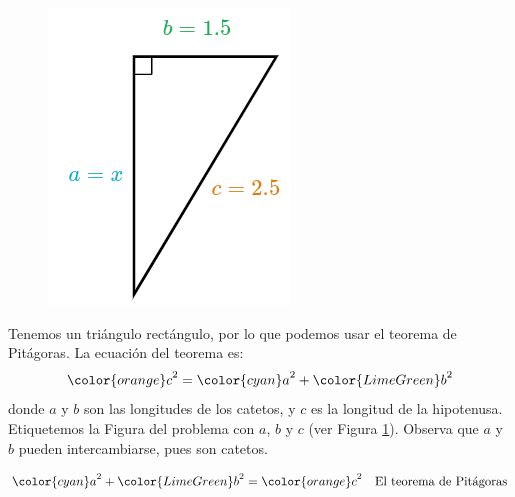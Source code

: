 \begin{minipage}[t][][t]{0.65\textwidth}
    \begin{solutionbox}{10cm}
        \begin{minipage}{0.4\textwidth}
            \begin{figure}[H]
                \centering
                \includegraphics[width=0.8\linewidth]{../images/lados_pitagoras_30a.png}
                \caption{}
                \label{fig:lados_pitagoras_30a}
            \end{figure}
        \end{minipage}\hfill
        \begin{minipage}{0.55\textwidth}
            Tenemos un triángulo rectángulo, por lo que podemos usar el teorema de Pitágoras.
            La ecuación del teorema es:
            \[{\color{orange}c}^2={\color{cyan}a}^2+{\color{LimeGreen}b}^2\]
            donde $a$ y $b$ son las longitudes de los catetos, y $c$ es la longitud de la hipotenusa.
            Etiquetemos la Figura del problema con $a$, $b$ y $c$ (ver Figura \ref{fig:lados_pitagoras_30a}).
            Observa que $a$ y $b$ pueden intercambiarse, pues son catetos.
        \end{minipage}
        \begin{align*}
            {\color{cyan}a}^2+{\color{LimeGreen}b}^2  ={\color{orange}c}^2     & \text{\quad El teorema de Pitágoras}                          \\

\end{align*}
\end{solutionbox}
\end{minipage}
